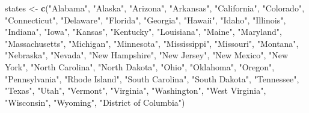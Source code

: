 \documentclass[
]{book}
\newenvironment{Shaded}{\begin{snugshade}}{\end{snugshade}}
\newcommand{\KeywordTok}[1]{\textcolor[rgb]{0.13,0.29,0.53}{\textbf{#1}}}
\newcommand{\NormalTok}[1]{#1}
\newcommand{\StringTok}[1]{\textcolor[rgb]{0.31,0.60,0.02}{#1}}
\begin{document}
\begin{Shaded}
\begin{Highlighting}[]
\NormalTok{states <-}\StringTok{ }\KeywordTok{c}\NormalTok{(}\StringTok{"Alabama"}\NormalTok{, }\StringTok{"Alaska"}\NormalTok{, }\StringTok{"Arizona"}\NormalTok{, }\StringTok{"Arkansas"}\NormalTok{, }\StringTok{"California"}\NormalTok{, }\StringTok{"Colorado"}\NormalTok{, }
            \StringTok{"Connecticut"}\NormalTok{, }\StringTok{"Delaware"}\NormalTok{, }\StringTok{"Florida"}\NormalTok{, }\StringTok{"Georgia"}\NormalTok{, }\StringTok{"Hawaii"}\NormalTok{, }\StringTok{"Idaho"}\NormalTok{, }
            \StringTok{"Illinois"}\NormalTok{, }\StringTok{"Indiana"}\NormalTok{, }\StringTok{"Iowa"}\NormalTok{, }\StringTok{"Kansas"}\NormalTok{, }\StringTok{"Kentucky"}\NormalTok{, }\StringTok{"Louisiana"}\NormalTok{, }
            \StringTok{"Maine"}\NormalTok{, }\StringTok{"Maryland"}\NormalTok{, }\StringTok{"Massachusetts"}\NormalTok{, }\StringTok{"Michigan"}\NormalTok{, }\StringTok{"Minnesota"}\NormalTok{, }
            \StringTok{"Mississippi"}\NormalTok{, }\StringTok{"Missouri"}\NormalTok{, }\StringTok{"Montana"}\NormalTok{, }\StringTok{"Nebraska"}\NormalTok{, }\StringTok{"Nevada"}\NormalTok{, }
            \StringTok{"New Hampshire"}\NormalTok{, }\StringTok{"New Jersey"}\NormalTok{, }\StringTok{"New Mexico"}\NormalTok{, }\StringTok{"New York"}\NormalTok{, }\StringTok{"North Carolina"}\NormalTok{, }
            \StringTok{"North Dakota"}\NormalTok{, }\StringTok{"Ohio"}\NormalTok{, }\StringTok{"Oklahoma"}\NormalTok{, }\StringTok{"Oregon"}\NormalTok{, }\StringTok{"Pennsylvania"}\NormalTok{, }
            \StringTok{"Rhode Island"}\NormalTok{, }\StringTok{"South Carolina"}\NormalTok{, }\StringTok{"South Dakota"}\NormalTok{, }\StringTok{"Tennessee"}\NormalTok{, }\StringTok{"Texas"}\NormalTok{, }
            \StringTok{"Utah"}\NormalTok{, }\StringTok{"Vermont"}\NormalTok{, }\StringTok{"Virginia"}\NormalTok{, }\StringTok{"Washington"}\NormalTok{, }\StringTok{"West Virginia"}\NormalTok{, }\StringTok{"Wisconsin"}\NormalTok{, }
            \StringTok{"Wyoming"}\NormalTok{, }\StringTok{"District of Columbia"}\NormalTok{)}


\end{Highlighting}
\end{Shaded}
\end{document}
